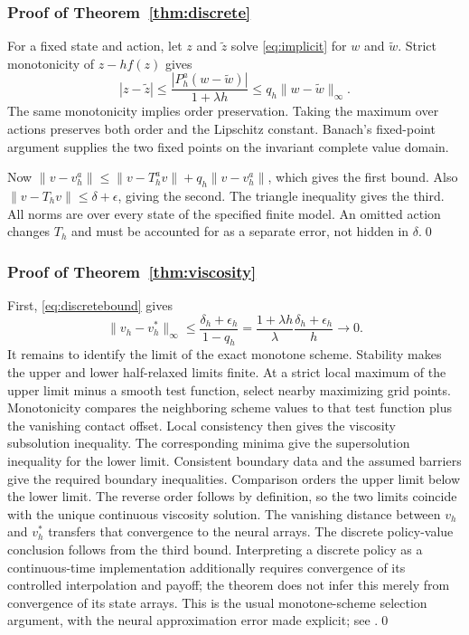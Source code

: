 \subsubsection{Proof of Theorem~\ref{thm:discrete}}
For a fixed state and action, let $z$ and $\tilde z$ solve \eqref{eq:implicit} for $w$ and $\tilde w$. Strict monotonicity of $z-hf(z)$ gives
\[
 |z-\tilde z|\leq\frac{|P_h^a(w-\tilde w)|}{1+\lambda h}
 \leq q_h\|w-\tilde w\|_\infty.
\]
The same monotonicity implies order preservation. Taking the maximum over actions preserves both order and the Lipschitz constant. Banach's fixed-point argument supplies the two fixed points on the invariant complete value domain.

Now $\|v-v_h^a\|\leq\|v-T_h^av\|+q_h\|v-v_h^a\|$, which gives the first bound. Also $\|v-T_hv\|\leq\delta+\epsilon$, giving the second. The triangle inequality gives the third. All norms are over every state of the specified finite model. An omitted action changes $T_h$ and must be accounted for as a separate error, not hidden in $\delta$.\qed

\subsubsection{Proof of Theorem~\ref{thm:viscosity}}
First, \eqref{eq:discretebound} gives
\[
 \|v_h-v_h^*\|_\infty\leq\frac{\delta_h+\epsilon_h}{1-q_h}
 =\frac{1+\lambda h}{\lambda}\frac{\delta_h+\epsilon_h}{h}\longrightarrow0.
\]
It remains to identify the limit of the exact monotone scheme. Stability makes the upper and lower half-relaxed limits finite. At a strict local maximum of the upper limit minus a smooth test function, select nearby maximizing grid points. Monotonicity compares the neighboring scheme values to that test function plus the vanishing contact offset. Local consistency then gives the viscosity subsolution inequality. The corresponding minima give the supersolution inequality for the lower limit. Consistent boundary data and the assumed barriers give the required boundary inequalities. Comparison orders the upper limit below the lower limit. The reverse order follows by definition, so the two limits coincide with the unique continuous viscosity solution. The vanishing distance between $v_h$ and $v_h^*$ transfers that convergence to the neural arrays. The discrete policy-value conclusion follows from the third bound. Interpreting a discrete policy as a continuous-time implementation additionally requires convergence of its controlled interpolation and payoff; the theorem does not infer this merely from convergence of its state arrays. This is the usual monotone-scheme selection argument, with the neural approximation error made explicit; see \citet{barles1991,crandall1992}.\qed

